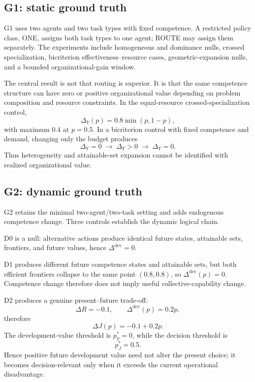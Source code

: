 \documentclass[10pt]{article}
\begin{document}
\subsection{G1: static ground truth}

G1 uses two agents and two task types with fixed competence. A restricted policy class, ONE, assigns both task types to one agent; ROUTE may assign them separately. The experiments include homogeneous and dominance nulls, crossed specialization, bicriterion effectiveness--resource cases, geometric-expansion nulls, and a bounded organizational-gain window.

The central result is not that routing is superior. It is that the same competence structure can have zero or positive organizational value depending on problem composition and resource constraints. In the equal-resource crossed-specialization control,
\begin{equation}
\Delta_Y(p)=0.8\min(p,1-p),
\end{equation}
with maximum $0.4$ at $p=0.5$. In a bicriterion control with fixed competence and demand, changing only the budget produces
\begin{equation}
\Delta_Y=0\;\rightarrow\;\Delta_Y>0\;\rightarrow\;\Delta_Y=0.
\end{equation}
Thus heterogeneity and attainable-set expansion cannot be identified with realized organizational value.

\subsection{G2: dynamic ground truth}

G2 retains the minimal two-agent/two-task setting and adds endogenous competence change. Three controls establish the dynamic logical chain.

D0 is a null: alternative actions produce identical future states, attainable sets, frontiers, and future values, hence $\Delta^{\mathrm{dev}}=0$.

D1 produces different future competence states and attainable sets, but both efficient frontiers collapse to the same point $(0.8,0.8)$, so $\Delta^{\mathrm{dev}}(p)=0$. Competence change therefore does not imply useful collective-capability change.

D2 produces a genuine present--future trade-off:
\begin{equation}
\Delta R=-0.1,
\qquad
\Delta^{\mathrm{dev}}(p)=0.2p,
\end{equation}
therefore
\begin{equation}
\Delta J(p)=-0.1+0.2p.
\end{equation}
The development-value threshold is $p_V^*=0$, while the decision threshold is
\begin{equation}
p_J^*=0.5.
\end{equation}
Hence positive future development value need not alter the present choice; it becomes decision-relevant only when it exceeds the current operational disadvantage.
\end{document}
